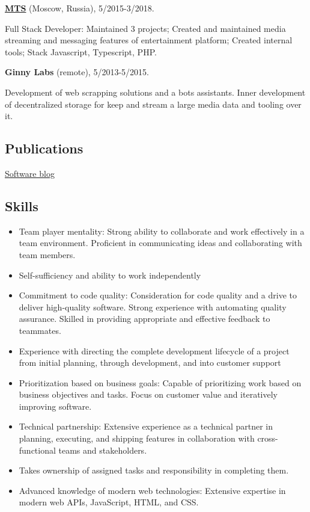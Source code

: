 \documentclass{vitonsky}
\begin{document}
\textbf{\href{https://mts.ru}{MTS}} (Moscow, Russia), 5/2015-3/2018.

Full Stack Developer: Maintained 3 projects; Created and maintained media streaming and messaging features of entertainment platform; Created internal tools; Stack Javascript, Typescript, PHP.

\textbf{Ginny Labs} (remote), 5/2013-5/2015.

Development of web scrapping solutions and a bots assistants. Inner development of decentralized storage for keep and stream a large media data and tooling over it.

\subsection*{Publications}

\href{https://vitonsky.net}{Software blog}

\subsection*{Skills}

\begin{itemize}
\item
  Team player mentality: Strong ability to collaborate and work effectively in a team environment. Proficient in communicating ideas and collaborating with team members.
\item
  Self-sufficiency and ability to work independently
\item
  Commitment to code quality: Consideration for code quality and a drive to deliver high-quality software. Strong experience with automating quality assurance. Skilled in providing appropriate and effective feedback to teammates.
\item
  Experience with directing the complete development lifecycle of a project from initial planning, through development, and into customer support
\item
  Prioritization based on business goals: Capable of prioritizing work based on business objectives and tasks. Focus on customer value and iteratively improving software.
\item
  Technical partnership: Extensive experience as a technical partner in planning, executing, and shipping features in collaboration with cross-functional teams and stakeholders.
\item
  Takes ownership of assigned tasks and responsibility in completing them.
\item
  Advanced knowledge of modern web technologies: Extensive expertise in modern web APIs, JavaScript, HTML, and CSS.
\end{itemize}
\end{document}
